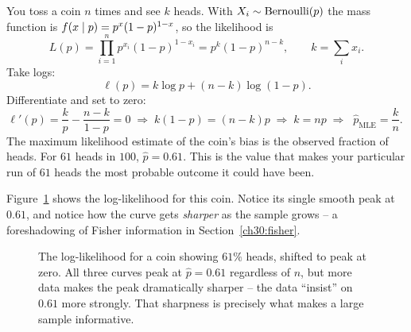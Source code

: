 \begin{example}
\label{ch30:ex-mle-bern}
You toss a coin $n$ times and see $k$ heads. With $X_i\sim\operatorname{Bernoulli}(p)$ the mass
function is $f(x\mid p)=p^x(1-p)^{1-x}$, so the likelihood is
\[
  L(p) = \prod_{i=1}^n p^{x_i}(1-p)^{1-x_i} = p^{k}(1-p)^{n-k},
  \qquad k = \sum_i x_i.
\]
Take logs:
\[
  \ell(p) = k\log p + (n-k)\log(1-p).
\]
Differentiate and set to zero:
\[
  \ell'(p) = \frac{k}{p} - \frac{n-k}{1-p} = 0
  \;\Longrightarrow\;
  k(1-p) = (n-k)p
  \;\Longrightarrow\;
  k = np
  \;\Longrightarrow\;
  \boxed{\;\hat p_{\mathrm{MLE}} = \frac{k}{n}.\;}
\]
The maximum likelihood estimate of the coin's bias is the observed fraction of
heads. For $61$ heads in $100$, $\hat p = 0.61$. This is
the value that makes your particular run of $61$ heads the most probable
outcome it could have been.
\end{example}

Figure~\ref{ch30:fig-loglik-bern} shows the log-likelihood for this coin. Notice
its single smooth peak at $0.61$, and notice how the curve gets \emph{sharper}
as the sample grows -- a foreshadowing of Fisher information in
Section~\ref{ch30:fisher}.

\begin{figure}[H]
\centering
{}
\caption{The log-likelihood for a coin showing $61\%$ heads, shifted to peak at
zero. All three curves peak at $\hat p = 0.61$ regardless of $n$, but more data
makes the peak dramatically sharper -- the data ``insist'' on $0.61$ more
strongly. That sharpness is precisely what makes a large sample informative.}
\label{ch30:fig-loglik-bern}
\end{figure}

